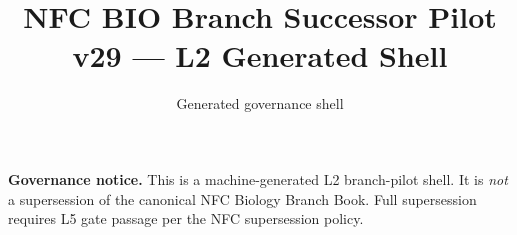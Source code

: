 \documentclass[11pt]{article}
\title{NFC BIO Branch Successor Pilot\\[0.5ex]\large v29 --- L2 Generated Shell}
\author{Generated governance shell}
\date{}
\begin{document}
\maketitle
\tableofcontents
\bigskip
\noindent\textbf{Governance notice.} This is a machine-generated L2 branch-pilot shell.
It is \emph{not} a supersession of the canonical NFC Biology Branch Book.
Full supersession requires L5 gate passage per the NFC supersession policy.
\vspace{1em}

\end{document}
